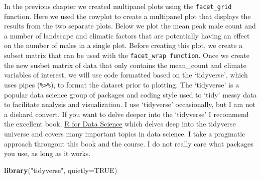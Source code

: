 \documentclass[
]{book}
\newenvironment{Shaded}{\begin{snugshade}}{\end{snugshade}}
\newcommand{\AttributeTok}[1]{\textcolor[rgb]{0.13,0.29,0.53}{#1}}
\newcommand{\ConstantTok}[1]{\textcolor[rgb]{0.56,0.35,0.01}{#1}}
\newcommand{\FunctionTok}[1]{\textcolor[rgb]{0.13,0.29,0.53}{\textbf{#1}}}
\newcommand{\NormalTok}[1]{#1}
\newcommand{\StringTok}[1]{\textcolor[rgb]{0.31,0.60,0.02}{#1}}
\begin{document}
In the previous chapter we created multipanel plots using the \texttt{facet\_grid} function. Here we used the cowplot to create a multipanel plot that displays the results from the two separate plots. Below we plot the mean peak male count and a number of landscape and climatic factors that are potentially having an effect on the number of males in a single plot. Before creating this plot, we create a subset matrix that can be used with the \texttt{facet\_wrap\ function}. Once we create the new susbet matrix of data that only contains the mean\_count and climate variables of interest, we will use code formatted based on the `tidyverse', which uses pipes (\texttt{\%\textgreater{}\%}), to format the dataset prior to plotting. The `tidyverse' is a popular data science group of packages and coding style used to `tidy' messy data to facilitate analysis and visualization. I use `tidyverse' occasionally, but I am not a diehard convert. If you want to delve deeper into the `tidyverse' I recommend the excellent book, \href{https://r4ds.hadley.nz/}{R for Data Science} which delves deep into the tidyverse universe and covers many important topics in data science. I take a pragmatic approach througout this book and the course. I do not really care what packages you use, as long as it works.

\begin{Shaded}
\begin{Highlighting}[]
\FunctionTok{library}\NormalTok{(}\StringTok{"tidyverse"}\NormalTok{, }\AttributeTok{quietly=}\ConstantTok{TRUE}\NormalTok{)}
\end{Highlighting}
\end{Shaded}
\end{document}
